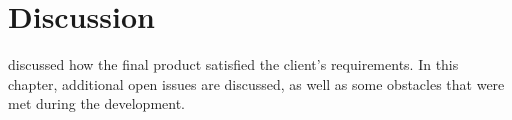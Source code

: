 \chapter{Discussion}
\label{cha:discussion}

 discussed how the final product satisfied the client's
requirements.  In this chapter, additional open issues are discussed, as well as
some obstacles that were met during the development.











